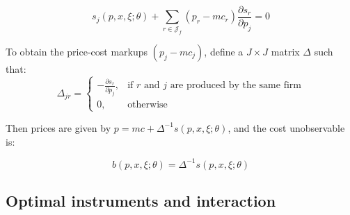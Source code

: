 \documentclass[12pt, oneside]{article}   	%
\newcommand{\parderiv}[2]{ \frac{\partial {#1}}{\partial {#2}}}
\newcommand{\J}{\mathcal{J}}
\begin{document}
$$s_j(p,x,\xi ; \theta) + \sum_{r \in \J_f} (p_r - mc_r) \parderiv{s_r}{p_j} = 0 $$

To obtain the price-cost markups $(p_j - mc_j)$, define a $J\times J$ matrix $\Delta$ such that:
$$\Delta_{jr} = \begin{cases} -\parderiv{s_r}{p_j}, & \text{if $r$ and $j$ are produced by the same firm} \\
0,  & \text{otherwise}
\end{cases}$$

Then prices are given by $p = mc + \Delta^{-1} s(p, x, \xi ; \theta)$, and the cost unobservable is:

$$b(p, x, \xi ; \theta) = \Delta^{-1} s(p, x, \xi ; \theta)$$

\subsection{Optimal instruments and interaction}
\end{document}
